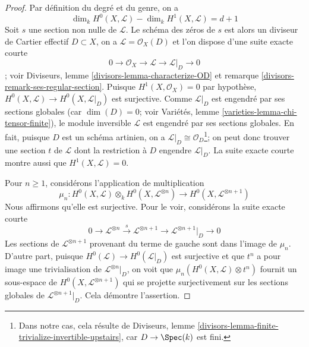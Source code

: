 \begin{proof}
Par définition du degré et du genre, on a $$
\dim_k H^0(X, \mathcal{L}) - \dim_k H^1(X, \mathcal{L}) = d + 1
$$ Soit $s$ une section non nulle de $\mathcal{L}$. Le schéma des zéros de $s$ est alors un diviseur de Cartier effectif $D \subset X$, on a $\mathcal{L} = \mathcal{O}_X(D)$ et l'on dispose d'une suite exacte courte $$
0 \to \mathcal{O}_X \to \mathcal{L} \to \mathcal{L}|_D \to 0
$$; voir Diviseurs, lemme \ref{divisors-lemma-characterize-OD} et remarque \ref{divisors-remark-ses-regular-section}. Puisque $H^1(X, \mathcal{O}_X) = 0$ par hypothèse, $H^0(X, \mathcal{L}) \to H^0(X, \mathcal{L}|_D)$ est surjective. Comme $\mathcal{L}|_D$ est engendré par ses sections globales (car $\dim(D) = 0$; voir Variétés, lemme \ref{varieties-lemma-chi-tensor-finite}), le module inversible $\mathcal{L}$ est engendré par ses sections globales. En fait, puisque $D$ est un schéma artinien, on a $\mathcal{L}|_D \cong \mathcal{O}_D$\footnote{Dans notre cas, cela résulte de Diviseurs, lemme \ref{divisors-lemma-finite-trivialize-invertible-upstairs}, car $D \to \Spec(k)$ est fini.}; on peut donc trouver une section $t$ de $\mathcal{L}$ dont la restriction à $D$ engendre $\mathcal{L}|_D$. La suite exacte courte montre aussi que $H^1(X, \mathcal{L}) = 0$.

\medskip\noindent
Pour $n \geq 1$, considérons l'application de multiplication $$
\mu_n :
H^0(X, \mathcal{L}) \otimes_k H^0(X, \mathcal{L}^{\otimes n})
\longrightarrow
H^0(X, \mathcal{L}^{\otimes n + 1})
$$ Nous affirmons qu'elle est surjective. Pour le voir, considérons la suite exacte courte $$
0 \to \mathcal{L}^{\otimes n} \xrightarrow{s}
\mathcal{L}^{\otimes n + 1} \to \mathcal{L}^{\otimes n + 1}|_D \to 0
$$ Les sections de $\mathcal{L}^{\otimes n + 1}$ provenant du terme de gauche sont dans l'image de $\mu_n$. D'autre part, puisque $H^0(\mathcal{L}) \to H^0(\mathcal{L}|_D)$ est surjective et que $t^n$ a pour image une trivialisation de $\mathcal{L}^{\otimes n}|_D$, on voit que $\mu_n(H^0(X, \mathcal{L}) \otimes t^n)$ fournit un sous-espace de $H^0(X, \mathcal{L}^{\otimes n + 1})$ qui se projette surjectivement sur les sections globales de $\mathcal{L}^{\otimes n + 1}|_D$. Cela démontre l'assertion.


\end{proof}
